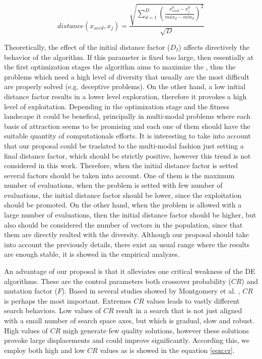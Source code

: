 \begin{equation}\label{eqn:distance}
distance ( x_{seed}, x_j ) = \frac{\sqrt{ \sum_{d=1}^D \left ( \frac{x_{seed}^d - x_j^d}{max_d - min_d} \right )^2  }} {\sqrt{D}}
\end{equation}


%
Theoretically, the effect of the initial distance factor ($D_I$) affects directively the behavior of the algorithm.
%
If this parameter is fixed too large, then essentially at the first optimization stages the algorithm aims to maximize the \DCN{}, thus the problems which need a high level of diversity that usually are the most difficult are properly solved (e.g. deceptive problems).
%
On the other hand, a low initial distance factor results in a lower level exploration, therefore it provokes a high level of exploitation.
%
Depending in the optimization stage and the fitness landscape it could be benefical, principally in multi-modal problems where each basis of attraction seems to be promising and each one of them should have the suitable quantity of computationals efforts.
%
It is interesting to take into account that our proposal could be traslated to the multi-modal fashion just setting a final distance factor, which should be strictly positive, however this trend is not considered in this work.
%
Therefore, when the initial distance factor is setted several factors should be taken into account.
%
One of them is the maximum number of evaluations, when the problem is setted with few number of evaluations, the initial distance factor should be lower, since the exploitation should be promoted.
%
On the other hand, when the problem is allowed with a large number of evaluations, then the initial distance factor should be higher, but also should be considered the number of vectors in the population, since that them are directly realted with the diversity.
%
Although our proposal should take into account the previously details, there exist an usual range where the results are enough stable, it is showed in the empirical analyzes.
%

An advantage of our proposal is that it alleviates one critical weakness of the DE algorithms.
%
These are the control parameters both crossover probability ($CR$) and mutation factor ($F$).
%
Based in several studies showed by Montgomery et al. \cite{montgomery2010analysis}, $CR$ is perhaps the most important.
%
Extremes $CR$ values leads to vastly different search behaviors.
%
Low values of $CR$ result in a search that is not just aligned with a small number of search space axes, but which is gradual, slow and robust.
%
High values of $CR$ migh generate few quality solutions, however these solutions provoke large displacements and could improve significantly.
%
According this, we employ both high and low $CR$ values as is showed in the equation \ref{eqn:cr}.

